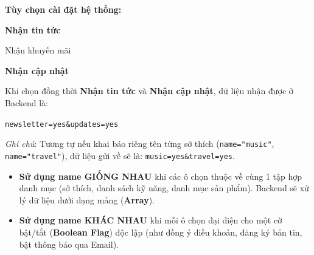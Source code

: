 \documentclass[11pt,oneside]{book}
\newcommand{\codeinline}[1]{\textcolor{accentOrange}{\texttt{#1}}}
\newcommand{\term}[1]{\textbf{\textcolor{primaryBlue}{#1}}}
\begin{document}
\begin{browserWindow}
\sffamily\small
\textbf{Tùy chọn cài đặt hệ thống:} \\[6pt]
 \; \textbf{Nhận tin tức} \quad
{} \; Nhận khuyến mãi \quad
{} \; \textbf{Nhận cập nhật} \\[8pt]
\end{browserWindow}

\begin{tipBox}
Khi chọn đồng thời \textbf{Nhận tin tức} và \textbf{Nhận cập nhật}, dữ liệu nhận được ở Backend là:
\begin{center}
\codeinline{newsletter=yes\&updates=yes}
\end{center}
\textit{Ghi chú}: Tương tự nếu khai báo riêng tên từng sở thích (\codeinline{name="music"}, \codeinline{name="travel"}), dữ liệu gửi về sẽ là: \codeinline{music=yes\&travel=yes}.
\end{tipBox}

\begin{conceptBox}
\begin{itemize}[leftmargin=1.5em, itemsep=3pt, parsep=0pt]
    \item \textbf{Sử dụng name GIỐNG NHAU} khi các ô chọn thuộc về cùng 1 tập hợp danh mục (sở thích, danh sách kỹ năng, danh mục sản phẩm). Backend sẽ xử lý dữ liệu dưới dạng mảng (\term{Array}).
    \item \textbf{Sử dụng name KHÁC NHAU} khi mỗi ô chọn đại diện cho một cờ bật/tắt (\term{Boolean Flag}) độc lập (như đồng ý điều khoản, đăng ký bản tin, bật thông báo qua Email).
\end{itemize}
\end{conceptBox}
\end{document}
